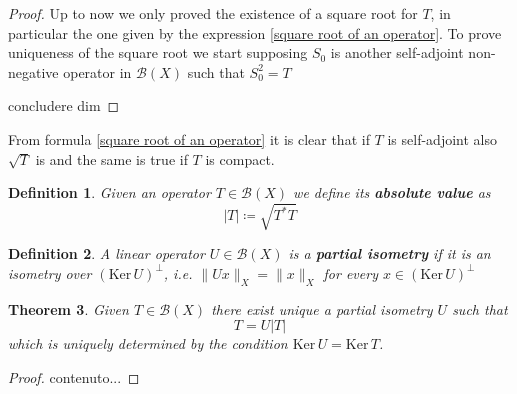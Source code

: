 \documentclass[corpo=11pt, stile=classica, tipotesi=custom,
greek, evenboxes, english]{toptesi}
\numberwithin{equation}{chapter}
\newtheorem{teo}{Theorem}[chapter] %
\newtheorem{defi}[teo]{Definition}
\theoremstyle{remark}
\newcommand{\B}{\mathscr{B}} %
\begin{document}
\begin{proof}
	Up to now we only proved the existence of a square root for $T$, in particular the one given by the expression \eqref{square root of an operator}. To prove uniqueness of the square root we start supposing $S_0$ is another self-adjoint non-negative operator in $\B(X)$ such that $S_0^2 = T$
	
	{\color{blue} concludere dim}
\end{proof}
From formula \eqref{square root of an operator} it is clear that if $T$ is self-adjoint also $\sqrt{T}$ is and the same is true if $T$ is compact.
\begin{defi}\label{absolute value of an operator definition}
	Given an operator $T \in \B(X)$ we define its \textbf{absolute value} as
	\begin{equation}\label{absolute value of an operator formula}
		|T| \coloneqq \sqrt{T^*T}
	\end{equation}
\end{defi}
\begin{defi}\label{partial isometry}
	A linear operator $U \in \B(X)$ is a \textbf{partial isometry} if it is an isometry over $(\mathrm{Ker}\,U)^{\perp}$, i.e. $\|Ux\|_X = \|x\|_X$ for every $x \in (\mathrm{Ker}\,U)^{\perp}$
\end{defi}
\begin{teo}\label{polar decomposition theorem}
	Given $T \in \B(X)$ there exist unique a partial isometry $U$ such that
	\begin{equation}\label{polar decomposition formula}
		T = U|T|
	\end{equation}
	which is uniquely determined by the condition $\mathrm{Ker}\,U = \mathrm{Ker}\,T$.
\end{teo}
\begin{proof}
	contenuto...
\end{proof}
\end{document}
